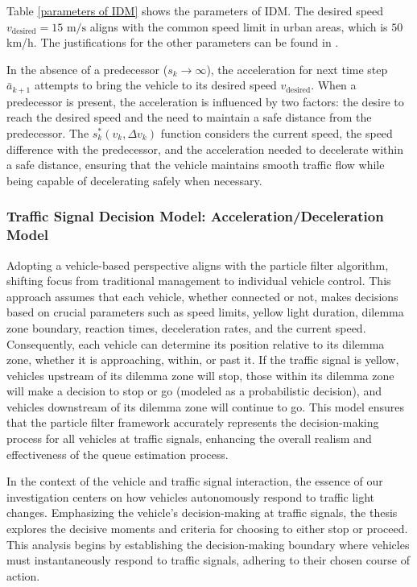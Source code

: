 Table \ref{parameters of IDM} shows the parameters of IDM. The desired speed $v_{\text{desired}} = 15 \text{ m/s}$ aligns with the common speed limit in urban areas, which is $50$ km/h. The justifications for the other parameters can be found in \textcite{treiber2013traffic}.

In the absence of a predecessor (\(s_k \rightarrow \infty\)), the acceleration for next time step \(\bar a_{k+1}\) attempts to bring the vehicle to its desired speed \(v_{\text{desired}}\). When a predecessor is present, the acceleration is influenced by two factors: the desire to reach the desired speed and the need to maintain a safe distance from the predecessor. The \(s_k^*(v_k, \Delta v_k)\) function considers the current speed, the speed difference with the predecessor, and the acceleration needed to decelerate within a safe distance, ensuring that the vehicle maintains smooth traffic flow while being capable of decelerating safely when necessary.





\subsubsection{Traffic Signal Decision Model: Acceleration/Deceleration Model}\label{Traffic Signal Decision Model: Acceleration/Deceleration Model}

Adopting a vehicle-based perspective aligns with the particle filter algorithm, shifting focus from traditional management to individual vehicle control. This approach assumes that each vehicle, whether connected or not, makes decisions based on crucial parameters such as speed limits, yellow light duration, dilemma zone boundary, reaction times, deceleration rates, and the current speed. Consequently, each vehicle can determine its position relative to its dilemma zone, whether it is approaching, within, or past it. If the traffic signal is yellow, vehicles upstream of its dilemma zone will stop, those within its dilemma zone will make a decision to stop or go (modeled as a probabilistic decision), and vehicles downstream of its dilemma zone will continue to go. This model ensures that the particle filter framework accurately represents the decision-making process for all vehicles at traffic signals, enhancing the overall realism and effectiveness of the queue estimation process.

In the context of the vehicle and traffic signal interaction, the essence of our investigation centers on how vehicles autonomously respond to traffic light changes. Emphasizing the vehicle's decision-making at traffic signals, the thesis explores the decisive moments and criteria for choosing to either stop or proceed. This analysis begins by establishing the decision-making boundary where vehicles must instantaneously respond to traffic signals, adhering to their chosen course of action.

